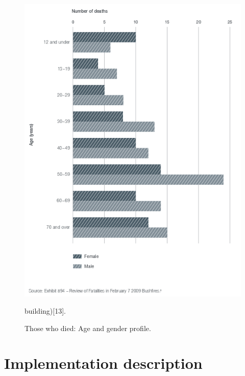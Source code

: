 \documentclass[12pt, a4paper]{memoir} %
\begin{document}
	\begin{figure}
		\begin{center}
			\includegraphics[scale=0.8]{stats2.png}
			\caption{
				\label{fig:stats} Those who died: Age and gender profile.
			}building)[13].
		\end{center}
	\end{figure}

\chapter{Implementation description}
\end{document}

